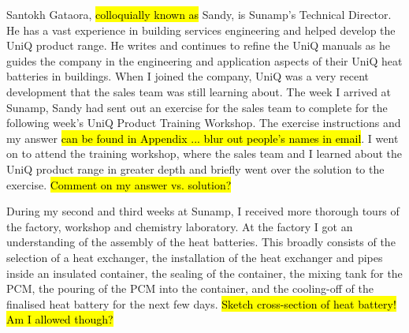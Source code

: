Santokh Gataora, \hl{colloquially known as} Sandy, is Sunamp's Technical Director.
He has a vast experience in building services engineering and helped develop the UniQ product range.
He writes and continues to refine the UniQ manuals as he guides the company in the engineering and application aspects of their UniQ heat batteries in buildings.
When I joined the company, UniQ was a very recent development that the sales team was still learning about.
The week I arrived at Sunamp, Sandy had sent out an exercise for the sales team to complete for the following week's UniQ Product Training Workshop.
The exercise instructions and my answer \hl{can be found in Appendix ... blur out people's names in email}.
I went on to attend the training workshop, where the sales team and I learned about the UniQ product range in greater depth and briefly went over the solution to the exercise.
\hl{Comment on my answer vs. solution?}

During my second and third weeks at Sunamp, I received more thorough tours of the factory, workshop and chemistry laboratory.
At the factory I got an understanding of the assembly of the heat batteries.
This broadly consists of the selection of a heat exchanger, the installation of the heat exchanger and pipes inside an insulated container, the sealing of the container, the mixing tank for the PCM, the pouring of the PCM into the container, and the cooling-off of the finalised heat battery for the next few days.
\hl{Sketch cross-section of heat battery! Am I allowed though?}

